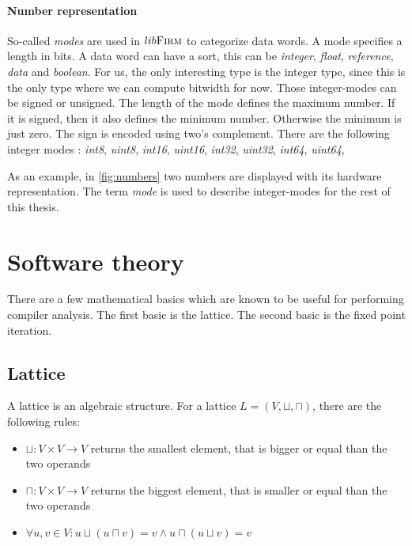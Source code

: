 \paragraph{Number representation}
So-called \textit{modes} are used in $lib\textsc{Firm}$ to categorize data words. A mode specifies a length in bits. A data word can have a sort, this can be \textit{integer}, \textit{float}, \textit{reference}, \textit{data} and \textit{boolean}. For us, the only interesting type is the integer type, since this is the only type where we can compute bitwidth for now. Those integer-modes can be signed or unsigned. The length of the mode defines the maximum number. If it is signed, then it also defines the minimum number. Otherwise the minimum is just zero. The sign is encoded using two's complement. There are the following integer modes : 
\textit{int8},
\textit{uint8},
\textit{int16},
\textit{uint16},
\textit{int32},
\textit{uint32},
\textit{int64},
\textit{uint64},

As an example, in \autoref{fig:numbers} two numbers are displayed with its hardware representation.
The term \textit{mode} is used to describe integer-modes for the rest of this thesis.


\section{Software theory}

There are a few mathematical basics which are known to be useful for performing compiler analysis. The first basic is the lattice. The second basic is the fixed point iteration.

\subsection{Lattice}

A lattice is an algebraic structure. For a lattice $L=(V,\sqcup,\sqcap)$, there are the following rules:

\begin{itemize}
	\item $\sqcup: V \times V \rightarrow V$ returns the smallest element, that is bigger or equal than the two operands
	\item $\sqcap: V \times V \rightarrow V$ returns the biggest element, that is smaller or equal than the two operands
	\item $\forall u,v \in V : u \sqcup ( u \sqcap v) = v \wedge u \sqcap ( u \sqcup v ) = v$
\end{itemize}

